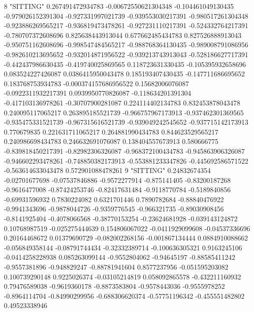 8 "SITTING" 0.267491472934783 -0.00672550621304348 -0.104461049130435 -0.979026152391304 -0.927331997021739 -0.939553030217391 -0.980517261304348 -0.923886269565217 -0.936819473478261 -0.927231110217391 -0.524332764217391 -0.780707372608696 0.825638443913044 0.677662485434783 0.827526888913043 -0.950751162608696 -0.998547484565217 -0.988768364130435 -0.989008791086956 -0.982610213695652 -0.932014871956522 -0.939213743913043 -0.528186627717391 -0.442437986630435 -0.419740025869565 0.118723631330435 -0.105395932658696 0.083524227426087 0.0386415950043478 0.185193407430435 -0.147711686695652 0.183768753934783 -0.000374157686956522 0.15682006076087 -0.0922311932217391 0.0939950770826087 -0.118634201391304 -0.417103136978261 -0.30707900281087 0.224114402134783 0.832453878043478 0.240095117065217 0.263895185521739 -0.966757967173913 -0.937462301369565 -0.935475331521739 -0.967315616521739 -0.939049242545652 -0.937715142173913 0.770679835 0.221631711065217 0.264881990434783 0.844623529565217 0.240986698434783 0.246632691076087 0.138404557673913 0.580666775 -0.839818450217391 -0.82982306326087 -0.968372100434783 -0.945863906326087 -0.946602293478261 -0.748850382173913 -0.553881233347826 -0.445692586571522 -0.563614633043478 0.572901088478261
9 "SITTING" 0.24832674354 -0.02701677698 -0.07537846886 -0.9572277914 -0.875141405 -0.83200187268 -0.9616477008 -0.87424253746 -0.82417631484 -0.9118770784 -0.5189840856 -0.69931596932 0.7830224082 0.6321701446 0.7890782684 -0.88840476922 -0.9941343696 -0.9878044726 -0.9359776545 -0.966321735 -0.89030908456 -0.8141925404 -0.4078066568 -0.38770153254 -0.23624681928 -0.039143124872 0.10768987519 -0.025275444639 0.154806067022 -0.0411929099608 -0.04537336696 0.20164468672 0.01379690729 -0.082002268156 -0.001867134444 0.0884910088662 -0.056849358144 -0.08791744434 -0.32332389714 -0.100636305321 0.9163245106 -0.0414258228938 0.085263099144 -0.9552804062 -0.94645197 -0.88585411242 -0.9557381896 -0.948829247 -0.88781941604 0.8577237956 -0.051595203082 0.100739290148 0.9225026374 -0.03105214819 0.058092865578 -0.432211160932 0.79476589038 -0.9619360178 -0.8873583804 -0.9578443036 -0.9555978252 -0.8964114704 -0.84990299956 -0.688306620374 -0.57751196342 -0.455551482802 0.49523338946
